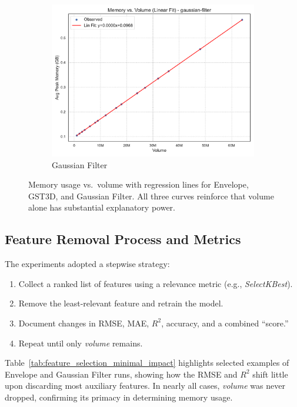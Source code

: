 \begin{figure}[htbp]
\begin{subfigure}[t]{0.32\textwidth}
        \includegraphics[width=\textwidth]{assets/images/05/memory_vs_volume_regression_gaussian-filter}
        \caption{Gaussian Filter}
    \end{subfigure}
    \caption{Memory usage vs.\ volume with regression lines for Envelope, \ac{GST3D}, and Gaussian Filter.
    All three curves reinforce that volume alone has substantial explanatory power.}
    \label{fig:memory_vs_volume_regression_subplots}
\end{figure}

\subsection{Feature Removal Process and Metrics}
\label{subsec:feature-removal-methods-and-metrics}

The experiments adopted a stepwise strategy:
\begin{enumerate}
    \item Collect a ranked list of features using a relevance metric (e.g., \emph{SelectKBest}). 
    \item Remove the least-relevant feature and retrain the model.
    \item Document changes in \ac{RMSE}, \ac{MAE}, $R^2$, accuracy, and a combined “score.”
    \item Repeat until only \emph{volume} remains.
\end{enumerate}
Table~\ref{tab:feature_selection_minimal_impact} highlights selected examples of Envelope and Gaussian Filter runs, showing how the \ac{RMSE} and $R^2$ shift little upon discarding most auxiliary features.
In nearly all cases, \emph{volume} was never dropped, confirming its primacy in determining memory usage.

